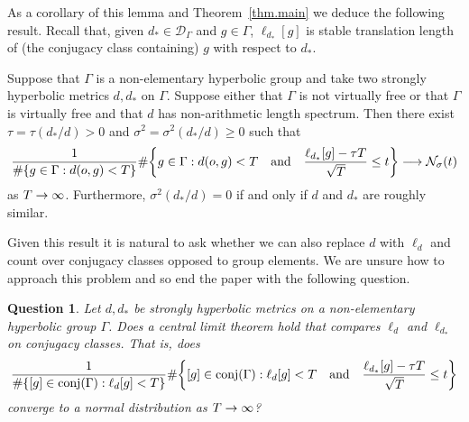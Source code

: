 \documentclass[10pt]{amsart}
\theoremstyle{definition}\newtheorem{defi}[theo]{Definition}\newtheorem{rema}[theo]{Remark}\newtheorem{exam}[theo]{Example}\newtheorem{exem}[theo]{Example}\newtheorem{nota}[theo]{Notation}
\newcommand{\G}{\Gamma}
\newcommand{\Dc}{\mathcal{D}}
\newcommand{\Nc}{\mathcal{N}}
\DeclareMathOperator{\conjj}{conj}
\let\originalleft\left
\let\originalright\right
\renewcommand{\left}{\mathopen{}\mathclose\bgroup\originalleft}
\renewcommand{\right}{\aftergroup\egroup\originalright}
\renewcommand*{\to}{\mathchoice{\longrightarrow}{\rightarrow}{\rightarrow}{\rightarrow}}
\theoremstyle{plain}
\newtheorem{ques}[theo]{Question}
\begin{document}
As a corollary of this lemma and Theorem~\ref{thm.main} we deduce the following result. Recall that, given $d_\ast \in \Dc_\G$ and $g \in \G$, $\ell_{d_\ast}[g]$ is stable translation length of (the conjugacy class containing) $g$ with respect to $d_\ast$.

\begin{coro}
Suppose that $\G$ is a non-elementary hyperbolic group and take two strongly hyperbolic metrics $d,d_\ast$ on $\G$. Suppose either that $\G$ is not virtually free or that $\G$ is virtually free and that $d$ has non-arithmetic length spectrum. Then there exist $\tau = \tau(d_\ast/d) >0$ and $\sigma^2 = \sigma^2(d_\ast/d) \ge 0$ such that
\[
\frac{1}{\#\{ g \in \G: d(o,g) < T\}} \#\left\{ g \in \G: d(o,g) < T \quad\text{and}\quad \frac{\ell_{d_\ast}[g] - \tau T}{\sqrt{T}} \le t \right\} \to \Nc_\sigma(t)
\]
as $T\to\infty$. Furthermore, $\sigma^2(d_\ast/d) = 0$ if and only if $d$ and $d_\ast$ are roughly similar.
\end{coro}

Given this result it is natural to ask whether we can also replace $d$ with $\ell_d$ and count over conjugacy classes opposed to group elements. We are unsure how to approach this problem and so end the paper with the following question.

\pagebreak{}
\begin{ques}
Let $d,d_\ast$ be strongly hyperbolic metrics on a non-elementary hyperbolic group $\G$. Does a central limit theorem hold that compares $\ell_d$ and $\ell_{d_\ast}$ on conjugacy classes. That is, does
\[
\frac{1}{\#\left\{ [g] \in \conjj(\G): \ell_d[g] < T\right\}} \#\left\{ [g] \in \conjj(\G): \ell_d[g] < T \quad \text{and}\quad \frac{\ell_{d_\ast}[g] - \tau T}{\sqrt{T}} \le t \right\}
\]
converge to a normal distribution as $T\to\infty$?
\end{ques}
\end{document}
